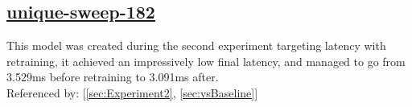 \documentclass[11pt]{report}
\begin{document}
\newpage


\subsection*{\protect\href{https://wandb.ai/samfh/Resnet56-Channels-Filters/runs/ptmmklr8?workspace=}{\underline{\color{blue}unique-sweep-182}}}\label{sec:unique-sweep-182}
This model was created during the second experiment targeting latency with retraining, it achieved an impressively low final latency, and managed to go from 3.529ms before retraining to 3.091ms after.\\
Referenced by: [\ref{sec:Experiment2}, \ref{sec:vsBaseline}]
\singlespacing
\begin{figure}[H]
    \begin{table}[H]
        \centering
        \hspace{2em}
    \end{table}    
\end{figure}
\doublespacing
\end{document}
